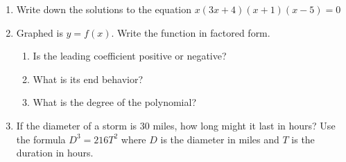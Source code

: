 \documentclass[12pt, twoside]{article}
\begin{document}
\begin{enumerate}
\item Write down the solutions to the equation $x(3x+4)(x +1)(x - 5) = 0$ \vspace{1.5cm} 

\item Graphed is $y = f(x)$. Write the function in factored form. 
    \begin{multicols}{2}
    \begin{enumerate}
      \item Is the leading coefficient positive or negative?
      \item What is its end behavior?
      \item What is the degree of the polynomial?
    \end{enumerate}
    \begin{flushright}
    \end{flushright}
    \end{multicols} \vspace{1cm}

\item If the diameter of a storm is 30 miles, how long might it last in hours? Use the formula
$D^3 = 216 T^2$ where $D$ is the diameter in miles and $T$ is the duration in hours.

\end{enumerate}
\end{document}
